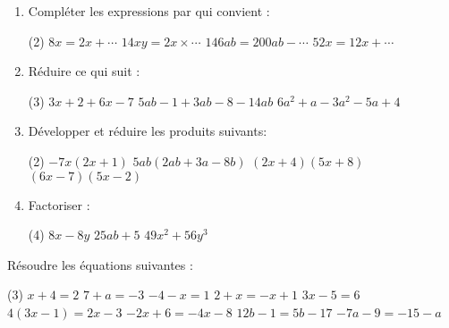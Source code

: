 \documentclass[a4paper,12pt]{article}
\begin{document}
\devoir[prv=true,ds=false,num=4 ,niv=1 ,date=12/02/2023,Rdate=19/02/2023]

\begin{exo}
\begin{enumerate}
\item Compléter les expressions par qui convient :
\begin{tasks}[style=itemize](2)
\task $8x = 2x + \cdots$
\task $14xy = 2x \times \cdots$
\task $146ab = 200ab - \cdots$
\task $52 x = 12 x + \cdots$

\end{tasks}
\item Réduire ce qui suit :
\begin{tasks}[style=itemize](3)
\task $3x+2+6x-7$
\task $5ab-1+3ab-8-14ab$
\task $6a^{2}+a-3a^{2}-5a+4$
\end{tasks}
\item Développer et réduire les produits suivants:
\begin{tasks}[style=itemize](2)
\task $-7x(2x+1)$
\task $5ab(2ab+3a-8b)$
\task $(2x+4)(5x+8)$
\task $(6x-7)(5x-2)$
\end{tasks}
\item Factoriser :
\begin{tasks}[style=itemize](4)
\task $8x-8y$
\task $25ab+5$
\task $49x^{2}+56y^{3}$
\end{tasks}
\end{enumerate}
\end{exo}

\begin{exo}
Résoudre les équations suivantes :
\begin{tasks}[style=itemize](3)
\task $x+4=2$
\task $7+a=-3$
\task $-4-x=1$
\task $2+x=-x+1$
\task $3x-5=6$
\task $4(3x-1)=2x-3$
\task $-2x+6=-4x-8$
\task $12b-1=5b-17$
\task $-7a-9=-15-a$
\end{tasks}
\end{exo}
\newpage

\begin{exo}
\end{exo}
\end{document}
